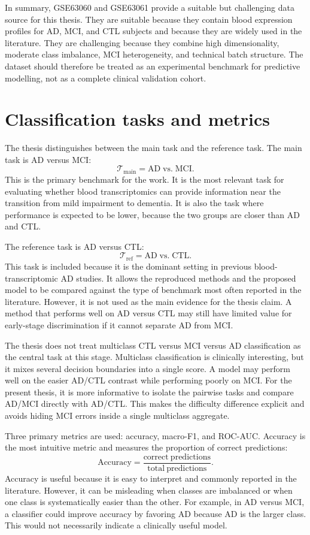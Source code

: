 In summary, GSE63060 and GSE63061 provide a suitable but challenging data source for this thesis. They are suitable because they contain blood expression profiles for AD, MCI, and CTL subjects and because they are widely used in the literature. They are challenging because they combine high dimensionality, moderate class imbalance, MCI heterogeneity, and technical batch structure. The dataset should therefore be treated as an experimental benchmark for predictive modelling, not as a complete clinical validation cohort.

\section{Classification tasks and metrics}
\label{sec:classification-tasks}

The thesis distinguishes between the main task and the reference task. The main task is AD versus MCI:
\[
    \mathcal{T}_{\mathrm{main}} = \mathrm{AD} \; \mathrm{vs.} \; \mathrm{MCI}.
\]
This is the primary benchmark for the work. It is the most relevant task for evaluating whether blood transcriptomics can provide information near the transition from mild impairment to dementia. It is also the task where performance is expected to be lower, because the two groups are closer than AD and CTL.

The reference task is AD versus CTL:
\[
    \mathcal{T}_{\mathrm{ref}} = \mathrm{AD} \; \mathrm{vs.} \; \mathrm{CTL}.
\]
This task is included because it is the dominant setting in previous blood-transcriptomic AD studies. It allows the reproduced methods and the proposed model to be compared against the type of benchmark most often reported in the literature. However, it is not used as the main evidence for the thesis claim. A method that performs well on AD versus CTL may still have limited value for early-stage discrimination if it cannot separate AD from MCI.

The thesis does not treat multiclass CTL versus MCI versus AD classification as the central task at this stage. Multiclass classification is clinically interesting, but it mixes several decision boundaries into a single score. A model may perform well on the easier AD/CTL contrast while performing poorly on MCI. For the present thesis, it is more informative to isolate the pairwise tasks and compare AD/MCI directly with AD/CTL. This makes the difficulty difference explicit and avoids hiding MCI errors inside a single multiclass aggregate.

Three primary metrics are used: accuracy, macro-F1, and ROC-AUC. Accuracy is the most intuitive metric and measures the proportion of correct predictions:
\[
    \mathrm{Accuracy} =
    \frac{\mathrm{correct\ predictions}}{\mathrm{total\ predictions}}.
\]
Accuracy is useful because it is easy to interpret and commonly reported in the literature. However, it can be misleading when classes are imbalanced or when one class is systematically easier than the other. For example, in AD versus MCI, a classifier could improve accuracy by favoring AD because AD is the larger class. This would not necessarily indicate a clinically useful model.

